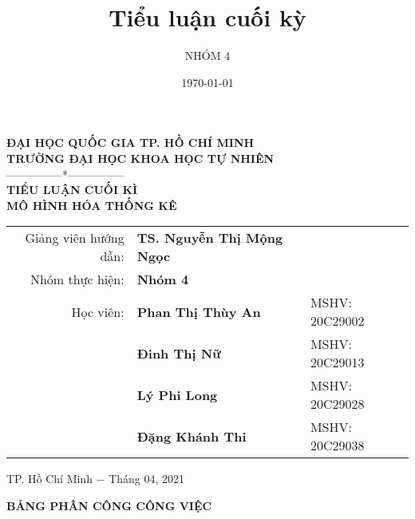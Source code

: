 \documentclass[a4paper]{book}
\title{Tiểu luận cuối kỳ}
\author{NHÓM 4}
\date{\today}%
\begin{document}
	
\begin{titlepage}
	\thispagestyle{empty}
	\begin{center}
		\textbf{\large{ĐẠI HỌC QUỐC GIA TP. HỒ CHÍ MINH\\TRƯỜNG ĐẠI HỌC KHOA HỌC TỰ NHIÊN}}\\
		---------------*---------------\\
		\vspace*{5.5cm}
		{\textcolor[rgb]{0.0,0.0,1.0}{\textbf{\Large{TIỂU LUẬN CUỐI KÌ}}}}\\
		\vspace{1cm}
		\textbf{\huge{\textcolor[rgb]{1.0,0.0,0.0}{MÔ HÌNH HÓA THỐNG KÊ}}}\\
		\vspace*{4cm}
		\begin{tabular}{rll}
			{Giảng viên hướng dẫn:} &{\bf TS. Nguyễn Thị Mộng Ngọc} &  \\
			{Nhóm thực hiện:}     & {\textbf{Nhóm 4}} & \\
			{Học viên:} & {\textbf{Phan Thị Thùy An}} &{MSHV: 20C29002} \\
			& {\textbf{Đinh Thị Nữ }} &{MSHV: 20C29013} \\
			& {\textbf{Lý Phi Long}} &{MSHV: 20C29028} \\
			& {\textbf{Đặng Khánh Thi}} &{MSHV: 20C29038} 
		\end{tabular}
		\vfill
		\normalsize{TP. Hồ Chí Minh $-$ Tháng 04, 2021}
	\end{center}
\end{titlepage}

\tableofcontents

\newpage
\thispagestyle{empty}

\begin{center}
	\textbf{\large{BẢNG PHÂN CÔNG CÔNG VIỆC}\\}
\end{center}
\end{document}
